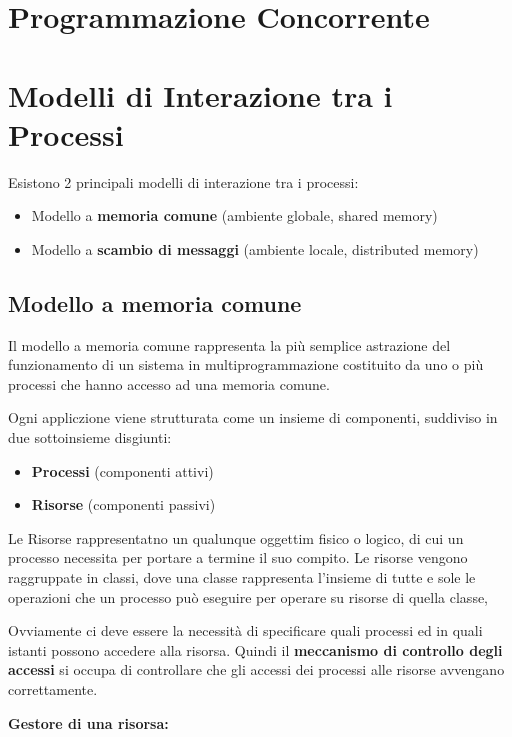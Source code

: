 \documentclass{article}
\begin{document}
\section{Programmazione Concorrente}


\section{Modelli di Interazione tra i Processi}

Esistono 2 principali modelli di interazione tra i processi:
\begin{itemize}
    \item Modello a \textbf{memoria comune} (ambiente globale, shared memory)
    \item Modello a \textbf{scambio di messaggi} (ambiente locale, distributed memory)
\end{itemize}

\subsection{Modello a memoria comune}

Il modello a memoria comune rappresenta la più semplice astrazione del funzionamento di un sistema in multiprogrammazione costituito da uno o più processi che hanno accesso
ad una memoria comune.

Ogni appliczione viene strutturata come un insieme di componenti, suddiviso in due sottoinsieme disgiunti:
\begin{itemize}
    \item \textbf{Processi} (componenti attivi)
    \item \textbf{Risorse} (componenti passivi)
\end{itemize}

Le Risorse rappresentatno un qualunque oggettim fisico o logico, di cui un processo necessita per portare a termine il suo compito.
Le risorse vengono raggruppate in classi, dove una classe rappresenta l'insieme di tutte e sole le operazioni che un processo può eseguire per operare su risorse di quella classe,

Ovviamente ci deve essere la necessità di specificare quali processi ed in quali istanti possono accedere alla risorsa. Quindi il \textbf{meccanismo di controllo degli accessi}
si occupa di controllare che gli accessi dei processi alle risorse avvengano correttamente.

\vspace{5mm}
\textbf{Gestore di una risorsa:}
\end{document}
